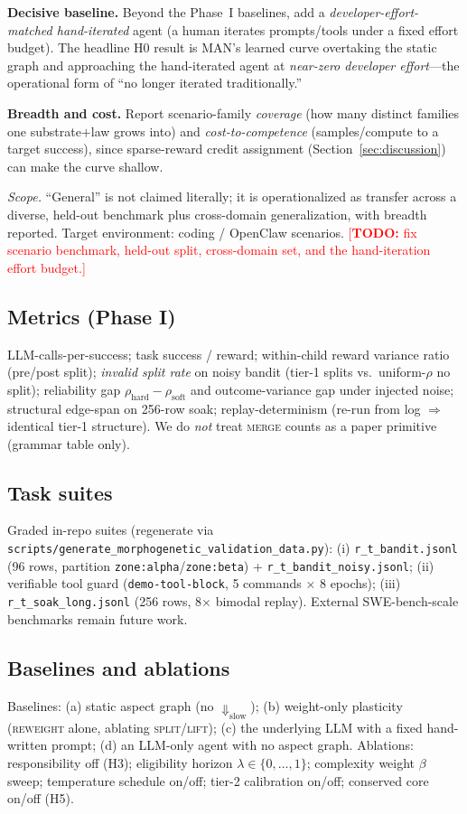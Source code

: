 \documentclass[11pt]{article}
\theoremstyle{definition}
\newcommand{\todo}[1]{\textcolor{red}{[\textbf{TODO:} #1]}}
\begin{document}
\noindent\textbf{Decisive baseline.} Beyond the Phase~I baselines, add a
\emph{developer-effort-matched hand-iterated} agent (a human iterates
prompts/tools under a fixed effort budget). The headline H0 result is MAN's
learned curve overtaking the static graph and approaching the hand-iterated
agent at \emph{near-zero developer effort}---the operational form of ``no
longer iterated traditionally.''

\noindent\textbf{Breadth and cost.} Report scenario-family \emph{coverage}
(how many distinct families one substrate$+$law grows into) and
\emph{cost-to-competence} (samples/compute to a target success), since
sparse-reward credit assignment (Section~\ref{sec:discussion}) can make the
curve shallow.

\noindent\emph{Scope.} ``General'' is not claimed literally; it is
operationalized as transfer across a diverse, held-out benchmark plus
cross-domain generalization, with breadth reported. Target environment:
coding / OpenClaw scenarios. \todo{fix scenario benchmark, held-out split,
cross-domain set, and the hand-iteration effort budget.}

\subsection{Metrics (Phase I)}
LLM-calls-per-success; task success / reward; within-child reward variance
ratio (pre/post split); \emph{invalid split rate} on noisy bandit (tier-1
splits vs.\ uniform-$\rho$ no split); reliability gap $\rho_\text{hard}-\rho_\text{soft}$
and outcome-variance gap under injected noise; structural edge-span on
256-row soak; replay-determinism (re-run from log $\Rightarrow$ identical
tier-1 structure). We do \emph{not} treat \textsc{merge} counts as a paper
primitive (grammar table only).

\subsection{Task suites}
Graded in-repo suites (regenerate via
\texttt{scripts/generate\_morphogenetic\_validation\_data.py}):
(i) \texttt{r\_t\_bandit.jsonl} (96 rows, partition
\texttt{zone:alpha}/\texttt{zone:beta}) + \texttt{r\_t\_bandit\_noisy.jsonl};
(ii) verifiable tool guard (\texttt{demo-tool-block}, 5 commands $\times$ 8
epochs); (iii) \texttt{r\_t\_soak\_long.jsonl} (256 rows, 8$\times$ bimodal
replay). External SWE-bench-scale benchmarks remain future work.

\subsection{Baselines and ablations}
Baselines: (a) static aspect graph (no $\Downarrow_\text{slow}$); (b) weight-only
plasticity (\textsc{reweight} alone, ablating \textsc{split}/\textsc{lift});
(c) the underlying LLM with a fixed hand-written prompt; (d) an LLM-only
agent with no aspect graph.
Ablations: responsibility off (H3); eligibility horizon
$\lambda\in\{0,\dots,1\}$; complexity weight $\beta$ sweep; temperature
schedule on/off; tier-2 calibration on/off; conserved core on/off (H5).
\end{document}
